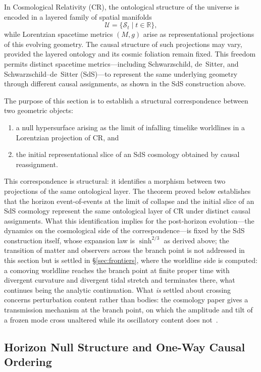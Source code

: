 \documentclass[11pt,a4paper]{article}
\theoremstyle{plain}
\theoremstyle{definition}
\theoremstyle{remark}
\begin{document}
In Cosmological Relativity (CR), the ontological structure of the universe is encoded in a layered family of spatial manifolds
\[
\mathcal{U}=\{\mathcal{S}_t \mid t\in\mathbb{R}\},
\]
while Lorentzian spacetime metrics $(M,g)$ arise as representational projections of this evolving geometry. The causal structure of such projections may vary, provided the layered ontology and its cosmic foliation remain fixed. This freedom permits distinct spacetime metrics---including Schwarzschild, de~Sitter, and Schwarzschild--de~Sitter (SdS)---to represent the same underlying geometry through different causal assignments, as shown in the SdS construction above.

The purpose of this section is to establish a structural correspondence between two geometric objects:
\begin{enumerate}
    \item a null hypersurface arising as the limit of infalling timelike worldlines in a Lorentzian projection of CR, and
    \item the initial representational slice of an SdS cosmology obtained by causal reassignment.
\end{enumerate}

This correspondence is structural: it identifies a morphism between two projections of the same ontological layer. The theorem proved below establishes that the horizon event-of-events at the limit of collapse and the initial slice of an SdS cosmology represent the same ontological layer of CR under distinct causal assignments. What this identification implies for the post-horizon evolution---the dynamics on the cosmological side of the correspondence---is fixed by the SdS construction itself, whose expansion law is $\sinh^{2/3}$ as derived above; the transition of matter and observers across the branch point is not addressed in this section but is settled in \S\ref{sec:frontiers}, where the worldline side is computed: a comoving worldline reaches the branch point at finite proper time with divergent curvature and divergent tidal stretch and terminates there, what continues being the analytic continuation.  What \emph{is} settled about crossing concerns perturbation content rather than bodies: the cosmology paper gives a transmission mechanism at the branch point, on which the amplitude and tilt of a frozen mode cross unaltered while its oscillatory content does not~\cite{JanzenCRcosmology}.

\subsection{Horizon Null Structure and One-Way Causal Ordering}
\end{document}
